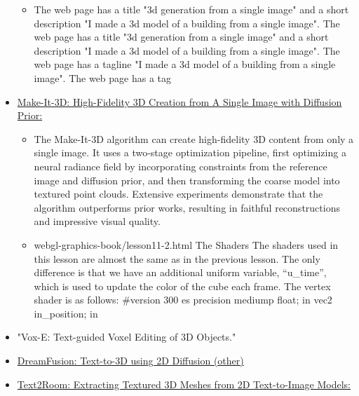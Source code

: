 \begin{itemize}
  \begin{itemize}
  
  \item
    The web page has a title "3d generation from a single image" and a
    short description "I made a 3d model of a building from a single
    image". The web page has a title "3d generation from a single image"
    and a short description "I made a 3d model of a building from a
    single image". The web page has a tagline "I made a 3d model of a
    building from a single image". The web page has a tag
  \end{itemize}
\item
  \href{https://make-it-3d.github.io/}{Make-It-3D: High-Fidelity 3D
  Creation from A Single Image with Diffusion Prior:}

  \begin{itemize}
  
  \item
    The Make-It-3D algorithm can create high-fidelity 3D content from
    only a single image. It uses a two-stage optimization pipeline,
    first optimizing a neural radiance field by incorporating
    constraints from the reference image and diffusion prior, and then
    transforming the coarse model into textured point clouds. Extensive
    experiments demonstrate that the algorithm outperforms prior works,
    resulting in faithful reconstructions and impressive visual quality.
  \item
    webgl-graphics-book/lesson11-2.html The Shaders The shaders used in
    this lesson are almost the same as in the previous lesson. The only
    difference is that we have an additional uniform variable,
    ``u\_time'', which is used to update the color of the cube each
    frame. The vertex shader is as follows: \#version 300 es precision
    mediump float; in vec2 in\_position; in
  \end{itemize}
\item
  "Vox-E: Text-guided Voxel Editing of 3D Objects."
\item
  \href{https://dreamfusion3d.github.io/}{DreamFusion: Text-to-3D using
  2D Diffusion (other)}
\item
  \href{https://lukashoel.github.io/text-to-room/}{Text2Room: Extracting
  Textured 3D Meshes from 2D Text-to-Image Models:}

  \begin{itemize}
  

\end{itemize}
\end{itemize}

